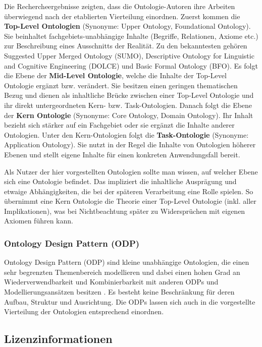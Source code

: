 \documentclass{article}
\begin{document}
Die Rechercheergebnisse zeigten, dass die Ontologie-Autoren ihre Arbeiten überwiegend nach der etablierten Vierteilung einordnen.
Zuerst kommen die \textbf{Top-Level Ontologien} (Synonyme: Upper Ontology, Foundational Ontology). Sie beinhaltet fachgebiets-unabhängige Inhalte (Begriffe, Relationen, Axiome etc.) zur Beschreibung eines Ausschnitts der Realität.
Zu den bekanntesten gehören Suggested Upper Merged Ontology (SUMO), Descriptive Ontology for Linguistic and Cognitive Engineering (DOLCE) und Basic Formal Ontology (BFO).
Es folgt die Ebene der \textbf{Mid-Level Ontologie}, welche die Inhalte der Top-Level Ontologie ergänzt bzw. verändert. Sie besitzen einen geringen thematischen Bezug und dienen als inhaltliche Brücke zwischen einer Top-Level Ontologie und ihr direkt untergeordneten Kern- bzw. Task-Ontologien.
Danach folgt die Ebene der \textbf{Kern Ontologie} (Synonyme: Core Ontology, Domain Ontology).
Ihr Inhalt bezieht sich stärker auf ein Fachgebiet oder sie ergänzt die Inhalte anderer Ontologien.
Unter den Kern-Ontologien folgt die \textbf{Task-Ontologie} (Synonyme: Application Ontology).
Sie nutzt in der Regel die Inhalte von Ontologien höherer Ebenen und stellt eigene Inhalte für einen konkreten Anwendungsfall bereit.

Als Nutzer der hier vorgestellten Ontologien sollte man wissen, auf welcher Ebene sich eine Ontologie befindet.
Das impliziert die inhaltliche Ausprägung und etwaige Abhängigkeiten, die bei der späteren Verarbeitung eine Rolle spielen.
So übernimmt eine Kern Ontologie die Theorie einer Top-Level Ontologie (inkl. aller Implikationen), was bei Nichtbeachtung später zu Widersprüchen mit eigenen Axiomen führen kann.

\subsubsection{Ontology Design Pattern (ODP)}

Ontology Design Pattern (ODP) sind kleine unabhängige Ontologien, die einen sehr begrenzten Themenbereich modellieren und dabei einen hohen Grad an Wiederverwendbarkeit und Kombinierbarkeit mit anderen ODPs und Modellierungsansätzen besitzen \cite{gangemi2009ontology}.
Es besteht keine Beschränkung für deren Aufbau, Struktur und Ausrichtung.
Die ODPs lassen sich auch in die vorgestellte Vierteilung der Ontologien entsprechend einordnen.

\subsection{Lizenzinformationen}
\end{document}

